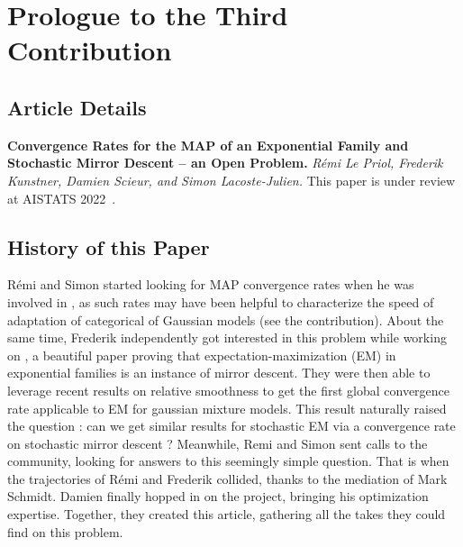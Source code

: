 \newcommand{\logpart}{A}
\newcommand{\conj}{{\logpart^*}}
\newcommand{\bregman}{\cB_\logpart}
\newcommand{\bregmanconj}{\cB_{\logpart^*}}
\newcommand{\nat}{\theta}
\newcommand{\m}{\mu}
\newcommand{\meanp}{\m}
\newcommand{\decrement}{D}
\newcommand{\linear}{\ell} %
\newcommand{\stepsize}{\gamma} %
\newcommand{\stgcvx}{\alpha} %
\newcommand{\smooth}{\beta} %

\newcommand{\MAPm}{\hat \m_n}
\newcommand{\MAPt}{\hat \nat_n}



\chapter{Prologue to the Third Contribution}

\section{Article Details}

\textbf{Convergence Rates for the MAP of an Exponential Family and Stochastic Mirror Descent -- an Open Problem.} 
\emph{R\'emi Le Priol, Frederik Kunstner, Damien Scieur, and Simon Lacoste-Julien.} 
This paper is under review at AISTATS 2022~\citep{lepriol2021convergence}.

\section{History of this Paper}
R\'emi and Simon started looking for MAP convergence rates when he was involved in \citet{lepriol2021analysis}, as such rates may have been helpful to characterize the speed of adaptation of categorical of Gaussian models (see the  contribution).
About the same time, Frederik independently got interested in this problem while working on \citet{kunstner2020homeomorphic}, a beautiful paper proving that expectation-maximization (EM) in exponential families is an instance of mirror descent. They were then able to leverage recent results on relative smoothness \citep{lu2018relatively} to get the first global convergence rate applicable to EM for gaussian mixture models. This result naturally raised the question : can we get similar results for stochastic EM via a convergence rate on stochastic mirror descent ? 
Meanwhile, Remi and Simon sent calls to the community, looking for answers to this seemingly simple question. That is when the trajectories of R\'emi and Frederik collided, thanks to the mediation of Mark Schmidt. 
Damien finally hopped in on the project, bringing his optimization expertise. 
Together, they created this article, gathering all the takes they could find on this problem.

